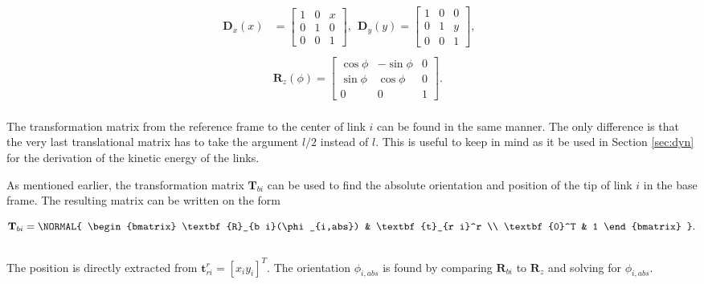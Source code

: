 \begin{equation}\label{eq:trans_rot}
    \begin{split}
        \textbf{D}_x(x)& = 
        \begin{bmatrix}
            1 & 0 & x \\
            0 & 1 & 0 \\
            0 & 0 & 1
        \end{bmatrix}, \ \
        \textbf{D}_y(y) =
        \begin{bmatrix}
            1 & 0 & 0 \\
            0 & 1 & y \\
            0 & 0 & 1
        \end{bmatrix}, \ \
        \\&
        \\&\textbf{R}_z(\phi) =
        \begin{bmatrix}
            \cos{\phi} & -\sin{\phi} & 0 \\
            \sin{\phi} &  \cos{\phi} & 0 \\
            0          &  0          & 1
        \end{bmatrix}.
    \end{split}
\end{equation}
\\
The transformation matrix from the reference frame to the center of link $i$ can be found in the same manner. The only difference is that the very last translational matrix has to take the argument $l/2$ instead of $l$. This is useful to keep in mind as it be used in Section \ref{sec:dyn} for the derivation of the kinetic energy of the links.

As mentioned earlier, the transformation matrix $\textbf{T}_{b i}$ can be used to find the absolute orientation and position of the tip of link $i$ in the base frame.
The resulting matrix can be written on the form

\begin{equation}
    \textbf{T}_{b i} =
    \NORMAL{
    \begin{bmatrix}
        \textbf{R}_{b i}(\phi_{i,abs}) & \textbf{t}_{r i}^r \\
        \textbf{0}^T & 1
    \end{bmatrix} }.
\end{equation}
\\
The position is directly extracted from $\textbf{t}_{r i}^r = [x_i y_i]^T$. The orientation $\phi_{i,abs}$ is found by comparing $\textbf{R}_{b i}$ to $\textbf{R}_z$ and solving for $\phi_{i,abs}$.

